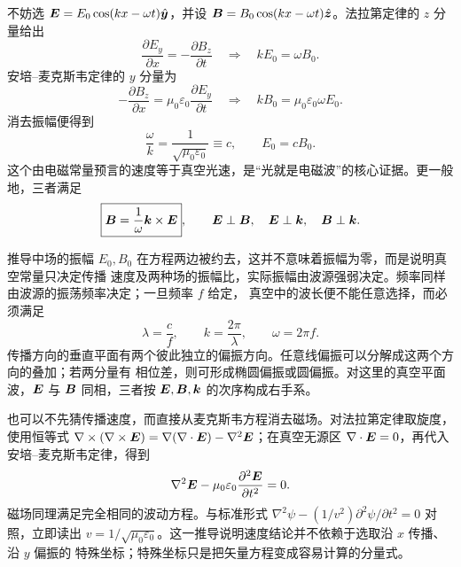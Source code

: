 {不妨选 $\bm{E}=E_0\cos(kx-\omega t)\hat{\bm{y}}$，并设
$\bm{B}=B_0\cos(kx-\omega t)\hat{\bm{z}}$。法拉第定律的 $z$ 分量给出
\begin{equation}
  \frac{\partial E_y}{\partial x}=-\frac{\partial B_z}{\partial t}
  \quad\Longrightarrow\quad
  kE_0=\omega B_0.
\end{equation}
安培--麦克斯韦定律的 $y$ 分量为
\begin{equation}
  -\frac{\partial B_z}{\partial x}
  =\mu_0\varepsilon_0\frac{\partial E_y}{\partial t}
  \quad\Longrightarrow\quad
  kB_0=\mu_0\varepsilon_0\omega E_0.
\end{equation}
消去振幅便得到
\begin{equation}
  \boxed{\frac{\omega}{k}=\frac{1}{\sqrt{\mu_0\varepsilon_0}}\equiv c},
  \qquad
  \boxed{E_0=cB_0}.
\end{equation}
这个由电磁常量预言的速度等于真空光速，是“光就是电磁波”的核心证据。更一般地，三者满足
\begin{equation}
  \boxed{\bm{B}=\frac{1}{\omega}\bm{k}\times\bm{E}},
  \qquad
  \bm{E}\perp\bm{B},\quad \bm{E}\perp\bm{k},
  \quad \bm{B}\perp\bm{k}.
\end{equation}

推导中场的振幅 $E_0,B_0$ 在方程两边被约去，这并不意味着振幅为零，而是说明真空常量只决定传播
速度及两种场的振幅比，实际振幅由波源强弱决定。频率同样由波源的振荡频率决定；一旦频率 $f$ 给定，
真空中的波长便不能任意选择，而必须满足
\begin{equation}
  \lambda=\frac{c}{f},\qquad k=\frac{2\pi}{\lambda},\qquad \omega=2\pi f.
\end{equation}
传播方向的垂直平面有两个彼此独立的偏振方向。任意线偏振可以分解成这两个方向的叠加；若两分量有
相位差，则可形成椭圆偏振或圆偏振。对这里的真空平面波，$\bm{E}$ 与 $\bm{B}$ 同相，三者按
$\bm{E},\bm{B},\bm{k}$ 的次序构成右手系。

也可以不先猜传播速度，而直接从麦克斯韦方程消去磁场。对法拉第定律取旋度，使用恒等式
$\nabla\times(\nabla\times\bm{E})=\nabla(\nabla\cdot\bm{E})-\nabla^2\bm{E}$；在真空无源区
$\nabla\cdot\bm{E}=0$，再代入安培--麦克斯韦定律，得到
\begin{equation}
  \nabla^2\bm{E}-\mu_0\varepsilon_0\frac{\partial^2\bm{E}}{\partial t^2}=0.
\end{equation}
磁场同理满足完全相同的波动方程。与标准形式
$\nabla^2\psi-(1/v^2)\partial^2\psi/\partial t^2=0$ 对照，立即读出
$v=1/\sqrt{\mu_0\varepsilon_0}$。这一推导说明速度结论并不依赖于选取沿 $x$ 传播、沿 $y$ 偏振的
特殊坐标；特殊坐标只是把矢量方程变成容易计算的分量式。

}
